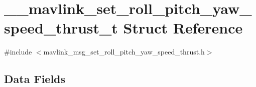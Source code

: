 \hypertarget{struct____mavlink__set__roll__pitch__yaw__speed__thrust__t}{\section{\-\_\-\-\_\-mavlink\-\_\-set\-\_\-roll\-\_\-pitch\-\_\-yaw\-\_\-speed\-\_\-thrust\-\_\-t Struct Reference}
\label{struct____mavlink__set__roll__pitch__yaw__speed__thrust__t}
}


{\ttfamily \#include $<$mavlink\-\_\-msg\-\_\-set\-\_\-roll\-\_\-pitch\-\_\-yaw\-\_\-speed\-\_\-thrust.\-h$>$}

\subsection*{Data Fields}
